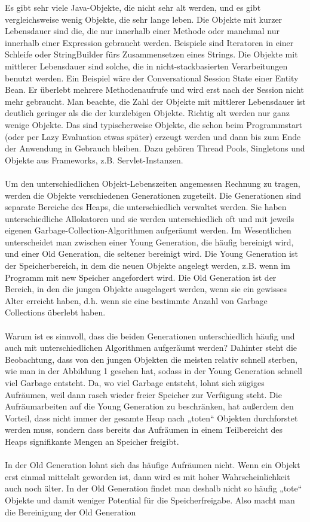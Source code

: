 \documentclass[a4paper,14pt]{scrreprt}
\begin{document}
Es gibt sehr viele Java-Objekte, die nicht sehr alt werden, und es gibt vergleichsweise wenig Objekte, die sehr lange leben.  Die Objekte mit kurzer Lebensdauer sind die, die nur innerhalb einer Methode oder manchmal nur innerhalb einer Expression gebraucht werden.  Beispiele sind Iteratoren in einer Schleife oder StringBuilder fürs Zusammensetzen eines Strings.  Die Objekte mit mittlerer Lebensdauer sind solche, die in nicht-stackbasierten Verarbeitungen benutzt werden.  Ein Beispiel wäre der Conversational Session State einer Entity Bean.  Er überlebt mehrere Methodenaufrufe und wird erst nach der Session nicht mehr gebraucht.  Man beachte, die Zahl der Objekte mit mittlerer Lebensdauer ist deutlich geringer als die der kurzlebigen Objekte.  Richtig alt werden nur ganz wenige Objekte.  Das sind typischerweise Objekte, die schon beim Programmstart (oder per Lazy Evaluation etwas später) erzeugt werden und dann bis zum Ende der Anwendung in Gebrauch bleiben.  Dazu gehören Thread Pools, Singletons und Objekte aus Frameworks, z.B. Servlet-Instanzen.\\\\Um den unterschiedlichen Objekt-Lebenszeiten angemessen Rechnung zu tragen, werden die Objekte verschiedenen Generationen zugeteilt.  Die Generationen sind separate Bereiche des Heaps, die unterschiedlich verwaltet werden.  Sie haben unterschiedliche Allokatoren und sie werden unterschiedlich oft und mit jeweils eigenen Garbage-Collection-Algorithmen aufgeräumt werden.  Im Wesentlichen unterscheidet man zwischen einer Young Generation, die häufig bereinigt wird, und einer Old Generation, die seltener bereinigt wird.  Die Young Generation ist der Speicherbereich, in dem die neuen Objekte angelegt werden, z.B. wenn im Programm mit new Speicher angefordert wird.  Die Old Generation ist der Bereich, in den die jungen Objekte ausgelagert werden, wenn sie ein gewisses Alter erreicht haben, d.h. wenn sie eine bestimmte Anzahl von Garbage Collections überlebt haben.\\\\Warum ist es sinnvoll, dass die beiden Generationen unterschiedlich häufig und auch mit unterschiedlichen Algorithmen aufgeräumt werden? Dahinter steht die Beobachtung, dass von den jungen Objekten die meisten relativ schnell sterben, wie man in der Abbildung 1 gesehen hat, sodass in der Young Generation schnell viel Garbage entsteht.  Da, wo viel Garbage entsteht, lohnt sich zügiges Aufräumen, weil dann rasch wieder freier Speicher zur Verfügung steht.  Die Aufräumarbeiten auf die Young Generation zu beschränken, hat außerdem den Vorteil, dass nicht immer der gesamte Heap nach „toten“ Objekten durchforstet werden muss, sondern dass bereits das Aufräumen in einem Teilbereicht des Heaps signifikante Mengen an Speicher freigibt.\\\\In der Old Generation lohnt sich das häufige Aufräumen nicht.  Wenn ein Objekt erst einmal mittelalt geworden ist, dann wird es mit hoher Wahrscheinlichkeit auch noch älter.  In der Old Generation findet man deshalb nicht so häufig „tote“ Objekte und damit weniger Potential für die Speicherfreigabe. Also macht man die Bereinigung der Old Generation 
\end{document}
